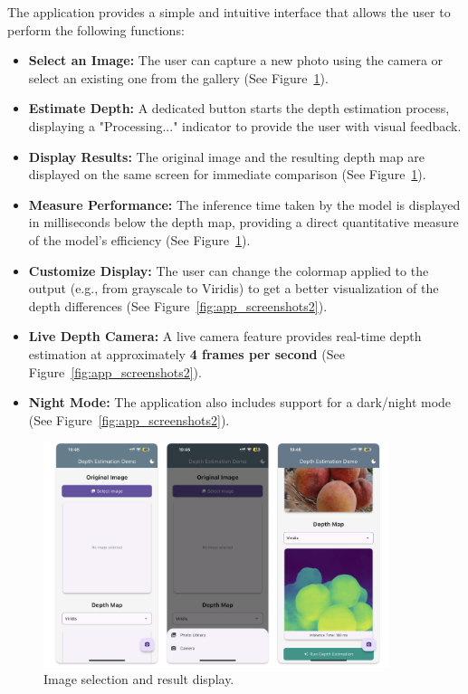 The application provides a simple and intuitive interface that allows the user to perform the following functions:
\begin{itemize}
    \item \textbf{Select an Image:} The user can capture a new photo using the camera or select an existing one from the gallery (See Figure~\ref{fig:app_screenshots1}).
    \item \textbf{Estimate Depth:} A dedicated button starts the depth estimation process, displaying a "Processing..." indicator to provide the user with visual feedback.
    \item \textbf{Display Results:} The original image and the resulting depth map are displayed on the same screen for immediate comparison (See Figure~\ref{fig:app_screenshots1}).
    \item \textbf{Measure Performance:} The inference time taken by the model is displayed in milliseconds below the depth map, providing a direct quantitative measure of the model's efficiency (See Figure~\ref{fig:app_screenshots1}).
    \item \textbf{Customize Display:} The user can change the colormap applied to the output (e.g., from grayscale to Viridis) to get a better visualization of the depth differences (See Figure~\ref{fig:app_screenshots2}).
    \item \textbf{Live Depth Camera:} A live camera feature provides real-time depth estimation at approximately \textbf{4 frames per second} (See Figure~\ref{fig:app_screenshots2}).
    \item \textbf{Night Mode:} The application also includes support for a dark/night mode (See Figure~\ref{fig:app_screenshots2}).
\end{itemize}

\begin{figure}[htbp!]
    \centering
    \includegraphics[width=0.9\textwidth]{images/app_screenshots_1.png}
    \caption{Image selection and result display.}
    \label{fig:app_screenshots1}
\end{figure}

